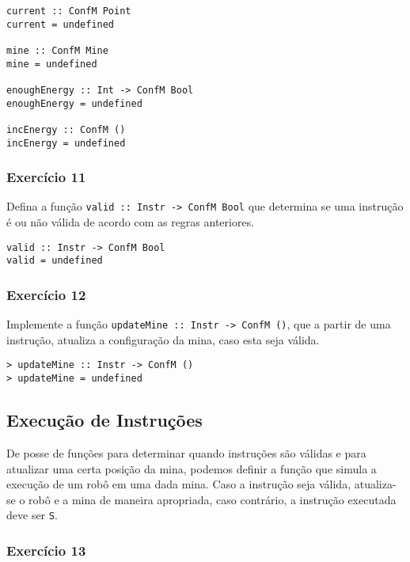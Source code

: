 \documentclass[a4paper]{article}
\begin{document}
\begin{verbatim}
current :: ConfM Point
current = undefined

mine :: ConfM Mine
mine = undefined

enoughEnergy :: Int -> ConfM Bool
enoughEnergy = undefined

incEnergy :: ConfM ()
incEnergy = undefined
\end{verbatim}

\subsubsection{Exercício 11}
\label{sec:org6a3386b}

Defina a função \texttt{valid :: Instr -> ConfM Bool} que determina
se uma instrução é ou não válida de acordo com as regras anteriores.

\begin{verbatim}
valid :: Instr -> ConfM Bool
valid = undefined
\end{verbatim}

\subsubsection{Exercício 12}
\label{sec:org89cfd0d}

Implemente a função \texttt{updateMine :: Instr -> ConfM ()}, que a
partir de uma instrução, atualiza a configuração da mina,
caso esta seja válida.

\begin{verbatim}
> updateMine :: Instr -> ConfM ()
> updateMine = undefined
\end{verbatim}

\subsection{Execução de Instruções}
\label{sec:org18f405a}

De posse de funções para determinar quando instruções são válidas e para atualizar
uma certa posição da mina, podemos definir a função que simula a execução de um robô em uma
dada mina. Caso a instrução seja válida, atualiza-se o robô e a mina de maneira apropriada,
caso contrário, a instrução executada deve ser \texttt{S}.

\subsubsection{Exercício 13}
\label{sec:orgdd72fda}
\end{document}
